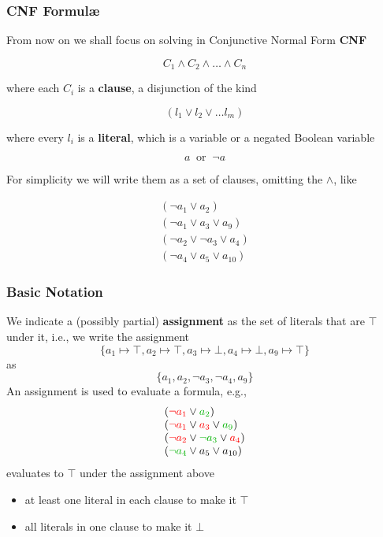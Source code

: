 \begin{frame}
  \frametitle{CNF Formul\ae}

  \scriptsize

  From now on we shall focus on solving \formulae in Conjunctive Normal Form {\bf CNF}

  $$ C_1 \wedge C_2  \wedge \ldots \wedge C_n  $$  

  where each $C_i$ is a {\bf clause}, a disjunction of the kind

  $$( l_1 \vee l_2 \vee \ldots l_m )$$  

  where every  $l_i$ is a {\bf literal}, which is a variable or a negated Boolean variable

  $$
  a\ \mbox{ or }\ \neg a
  $$

  \vfill
  \pause
  For simplicity we will write them as a set of clauses, omitting the $\wedge$, like

  $$
  \begin{array}{l}
  (\neg a_1 \vee a_2) \\
  (\neg a_1 \vee a_3 \vee a_9) \\
  (\neg a_2 \vee \neg a_3 \vee a_4) \\
  (\neg a_4 \vee a_5 \vee a_{10})
  \end{array}
  $$

\end{frame}

\begin{frame}
  \frametitle{Basic Notation}

  We indicate a (possibly partial) {\bf assignment} as the set of literals that
  are $\top$ under it, i.e., we write the assignment 
  $$
  \{ a_1 \mapsto \top, a_2 \mapsto \top, a_3 \mapsto \bot, a_4 \mapsto \bot, a_9 \mapsto \top \}
  $$
  as
  $$
  \{ a_1, a_2, \neg a_3, \neg a_4, a_9 \}
  $$
  \vfill
  \pause
  An assignment is used to evaluate a formula, e.g.,
  $$
  \begin{array}{l}
  (\colone{\neg a_1} \vee \coltwo{a_2}) \\
  (\colone{\neg a_1} \vee \colone{a_3} \vee \coltwo{a_9}) \\
  (\colone{\neg a_2} \vee \coltwo{\neg a_3} \vee \colone{a_4}) \\
  (\coltwo{\neg a_4} \vee a_5 \vee a_{10})
  \end{array}
  $$
  evaluates to $\top$ under the assignment above 
  \pause
  \begin{itemize}
    \item at least one  literal in each clause to make it $\top$
    \item all  literals in one clause to make it $\bot$
  \end{itemize}

\end{frame}

